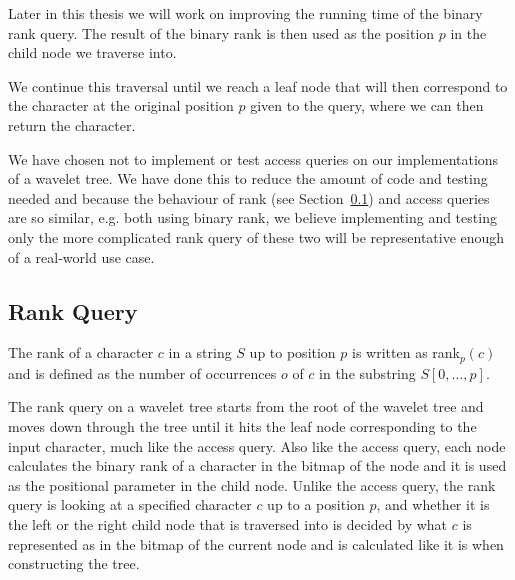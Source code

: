 Later in this thesis we will work on improving the running time of the binary rank query.
The result of the binary rank is then used as the position $p$ in the child node we traverse into.

We continue this traversal until we reach a leaf node that will then correspond to the character at the original position $p$ given to the query, where we can then return the character.

We have chosen not to implement or test access queries on our implementations of a wavelet tree.
We have done this to reduce the amount of code and testing needed and because the behaviour of rank (see Section~\ref{sec:rankDescription}) and access queries are so similar, e.g. both using binary rank, we believe implementing and testing only the more complicated rank query of these two will be representative enough of a real-world use case.

\subsection{Rank Query}
\label{sec:rankDescription}
The rank of a character $c$ in a string $S$ up to position $p$ is written as rank$_{p}(c)$ and is defined as the number of occurrences $o$ of $c$ in the substring $S[0, \ldots, p]$.

The rank query on a wavelet tree starts from the root of the wavelet tree and moves down through the tree until it hits the leaf node corresponding to the input character, much like the access query.
Also like the access query, each node calculates the binary rank of a character in the bitmap of the node and it is used as the positional parameter in the child node.
Unlike the access query, the rank query is looking at a specified character $c$ up to a position $p$, and whether it is the left or the right child node that is traversed into is decided by what $c$ is represented as in the bitmap of the current node and is calculated like it is when constructing the tree.

